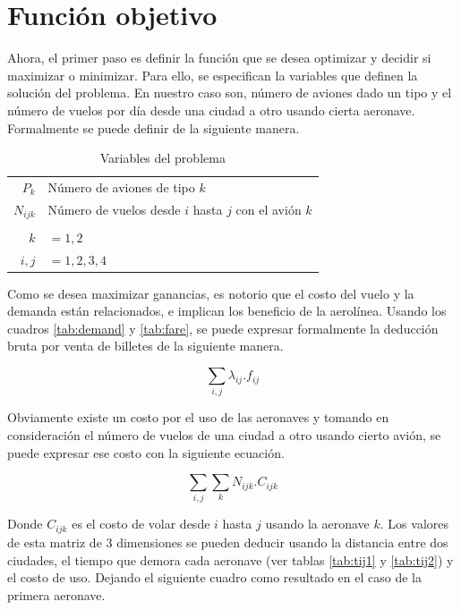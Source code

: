 \documentclass[12pt]{article}
\begin{document}
\section{Función objetivo}

Ahora, el primer paso es definir la función que se desea optimizar y decidir si maximizar o minimizar. Para ello, se especifican la variables que definen la solución del problema. En nuestro caso son, número de aviones dado un tipo y el número de vuelos por día desde una ciudad a otro usando cierta aeronave. Formalmente se puede definir de la siguiente manera.

\begin{table}[h!]
    \centering
    \begin{tabular}{r l}
        $P_{k}$   & Número de aviones de tipo $k$\\
        $N_{ijk}$ & Número de vuelos desde $i$ hasta $j$ con el avión $k$\\
         & \\
        $k$ & $= 1,2$\\
        $i,j$ & $= 1,2,3,4$
    \end{tabular}
    \caption{Variables del problema}
    \label{tab:variables}
\end{table}

Como se desea maximizar ganancias, es notorio que el costo del vuelo y la demanda están relacionados, e implican los beneficio de la aerolínea. Usando los cuadros \ref{tab:demand} y \ref{tab:fare}, se puede expresar formalmente la deducción bruta por venta de billetes de la siguiente manera.

\begin{equation}
    \sum_{i,j} \lambda_{ij}.f_{ij}
\end{equation}

Obviamente existe un costo por el uso de las aeronaves y tomando en consideración el número de vuelos de una ciudad a otro usando cierto avión, se puede expresar ese costo con la siguiente ecuación.

\begin{equation}
    \sum_{i,j}\sum_{k} N_{ijk}.C_{ijk}
\end{equation}

Donde $C_{ijk}$ es el costo de volar desde $i$ hasta $j$ usando la aeronave $k$. Los valores de esta matriz de 3 dimensiones se pueden deducir usando la distancia entre dos ciudades, el tiempo que demora cada aeronave (ver tablas \ref{tab:tij1} y \ref{tab:tij2}) y el costo de uso. Dejando el siguiente cuadro como resultado en el caso de la primera aeronave.
\end{document}

